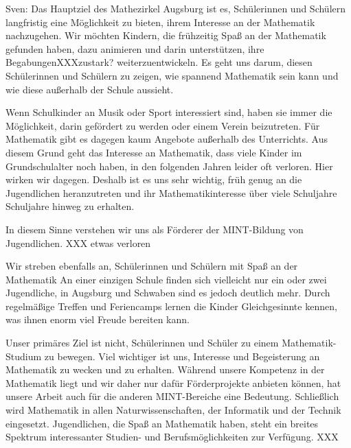\documentclass[12pt]{zettel}
\begin{document}
\begin{small}
Sven:
Das Hauptziel des Mathezirkel Augsburg ist es, Schülerinnen und Schülern
langfristig eine Möglichkeit zu bieten, ihrem Interesse an der
Mathematik nachzugehen. Wir möchten Kindern, die frühzeitig Spaß an der
Mathematik gefunden haben, dazu animieren und darin unterstützen, ihre
BegabungenXXXzustark? weiterzuentwickeln.
Es geht uns darum, diesen Schülerinnen und
Schülern zu zeigen, wie spannend Mathematik sein kann und wie diese außerhalb der Schule aussieht. 

Wenn Schulkinder an Musik oder Sport interessiert sind, haben sie immer die
Möglichkeit, darin gefördert zu werden oder einem Verein beizutreten. Für
Mathematik gibt es dagegen kaum Angebote außerhalb des Unterrichts. Aus diesem
Grund geht das Interesse an Mathematik, dass viele Kinder im Grundschulalter
noch haben, in den folgenden Jahren leider oft verloren. Hier wirken wir
dagegen. Deshalb ist es uns sehr wichtig, früh genug an die Jugendlichen
heranzutreten und ihr Mathematikinteresse über viele Schuljahre
Schuljahre hinweg zu erhalten.

In diesem Sinne verstehen wir uns als Förderer der MINT-Bildung von
Jugendlichen. XXX etwas verloren

Wir streben ebenfalls an, Schülerinnen und Schülern mit Spaß an der Mathematik
An einer einzigen Schule finden sich vielleicht
nur ein oder zwei Jugendliche, in Augsburg und Schwaben sind es jedoch
deutlich mehr. Durch regelmäßige Treffen und Feriencamps lernen die
Kinder Gleichgesinnte kennen, was ihnen enorm viel Freude bereiten kann.

Unser primäres Ziel ist nicht, Schülerinnen und Schüler zu einem
Mathematik-Studium zu bewegen. Viel wichtiger ist uns, Interesse und
Begeisterung an Mathematik zu wecken und zu erhalten. Während unsere Kompetenz
in der Mathematik liegt und wir daher nur dafür Förderprojekte anbieten können,
hat unsere Arbeit auch für die anderen MINT-Bereiche eine Bedeutung.
Schließlich wird Mathematik in allen Naturwissenschaften, der Informatik und
der Technik eingesetzt. Jugendlichen, die Spaß an Mathematik haben, steht ein
breites Spektrum interessanter Studien- und Berufsmöglichkeiten zur Verfügung.
XXX
\end{small}
\end{document}
